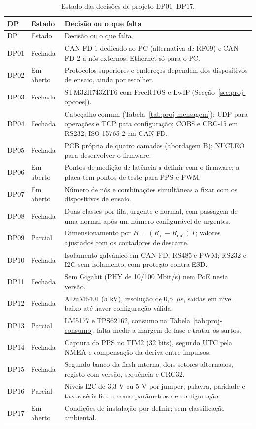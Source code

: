 \begingroup
\small
{}
\renewcommand{\arraystretch}{1.12}
\begin{longtable}{@{}>{\raggedright\arraybackslash}p{}>{\raggedright\arraybackslash}p{}>{\raggedright\arraybackslash}p{}@{}}
\caption{Estado das decisões de projeto DP01--DP17.}\label{tab:proj-decisoes}\\
\toprule
\rowcolor{LasetTint}
DP & Estado & Decisão ou o que falta \\
\midrule
\endfirsthead
\toprule
\rowcolor{LasetTint}
DP & Estado & Decisão ou o que falta \\
\midrule
\endhead
\bottomrule
\endlastfoot
DP01 & Fechada & CAN FD 1 dedicado ao PC (alternativa de RF09) e CAN FD 2 a nós externos; Ethernet só para o PC. \\
DP02 & Em aberto & Protocolos superiores e endereços dependem dos dispositivos de ensaio, ainda por escolher. \\
DP03 & Fechada & STM32H743ZIT6 com FreeRTOS e LwIP (Secção~\ref{sec:proj-opcoes}). \\
DP04 & Fechada & Cabeçalho comum (Tabela~\ref{tab:proj-mensagem}); UDP para operações e TCP para configuração; COBS e CRC-16 em RS232; ISO 15765-2 em CAN FD. \\
DP05 & Fechada & PCB própria de quatro camadas (abordagem B); NUCLEO para desenvolver o firmware. \\
DP06 & Em aberto & Pontos de medição de latência a definir com o firmware; a placa tem pontos de teste para PPS e PWM. \\
DP07 & Em aberto & Número de nós e combinações simultâneas a fixar com os dispositivos de ensaio. \\
DP08 & Fechada & Duas classes por fila, urgente e normal, com passagem de uma normal após um número configurável de urgentes. \\
DP09 & Parcial & Dimensionamento por $B = (R_{\mathrm{in}} - R_{\mathrm{out}})\,T$; valores ajustados com os contadores de descarte. \\
DP10 & Fechada & Isolamento galvânico em CAN FD, RS485 e PWM; RS232 e I2C sem isolamento, com proteção contra ESD. \\
DP11 & Fechada & Sem Gigabit (PHY de 10/100 Mbit/s) nem PoE nesta versão. \\
DP12 & Fechada & ADuM6401 (5 kV), resolução de 0,5~$\mu$s, saídas em nível baixo até haver configuração válida. \\
DP13 & Parcial & LM5177 e TPS62162, consumo na Tabela~\ref{tab:proj-consumo}; falta medir a margem de fase e tratar os surtos. \\
DP14 & Fechada & Captura do PPS no TIM2 (32 bits), segundo UTC pela NMEA e compensação da deriva entre impulsos. \\
DP15 & Fechada & Segundo banco da flash interna, dois setores alternados, registo com versão, sequência e CRC32. \\
DP16 & Parcial & Níveis I2C de 3,3 V ou 5 V por jumper; palavra, paridade e taxas série ficam como parâmetros de configuração. \\
DP17 & Em aberto & Condições de instalação por definir; sem classificação ambiental. \\
\end{longtable}
